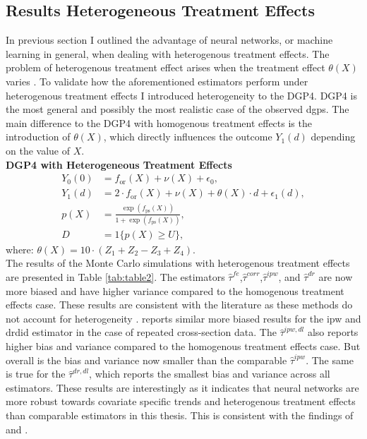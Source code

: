 \subsection{Results Heterogeneous Treatment Effects}
In previous section I outlined the advantage of neural networks, or machine learning in general, when dealing with heterogenous treatment effects.
The problem of heterogenous treatment effect arises when the treatment effect $\theta(X)$ varies \citep{hansen2022econometrics}.
To validate how the aforementioned estimators perform under heterogenous treatment effects I introduced heterogeneity to the DGP4.
DGP4 is the most general and possibly the most realistic case of the observed \ac{dgp}s.
The main difference to the DGP4 with homogenous treatment effects is the introduction of $\theta(X)$, which directly influences the outcome $Y_1(d)$ depending on the value of $X$.
\\
\textbf{DGP4 with Heterogeneous Treatment Effects}
\begin{align*}
    Y_0(0) &= f_{\text{or}}(X) + \nu(X) + \epsilon_0, \\
    Y_1(d) &= 2 \cdot f_{\text{or}}(X) + \nu(X) + \theta(X) \cdot d + \epsilon_1(d), \\
    p(X) &= \frac{\exp \left( f_{\text{ps}}(X) \right)}{1 + \exp \left( f_{\text{ps}}(X) \right)}, \\
    D &= 1\{ p(X) \geq U \},
\end{align*}
where: $\theta(X) = 10 \cdot (Z_1 + Z_2 - Z_3 + Z_4)$.\\

The results of the Monte Carlo simulations with heterogenous treatment effects are presented in Table \ref{tab:table2}.
The estimators $\hat{\tau}^{fe}$,$\hat{\tau}^{corr}$,$\hat{\tau}^{ipw}$, and $\hat{\tau}^{dr}$ are now more biased and have higher variance compared to the homogenous treatment effects case.
These results are consistent with the literature as these methods do not account for heterogeneity \citep{hansen2022econometrics}.
\citet{manfeDifferenceInDifferenceDesignRepeated} reports similar more biased results for the \ac{ipw} and \ac{drdid} estimator in the case of repeated cross-section data.
The $\hat{\tau}^{ipw,dl}$ also reports higher bias and variance compared to the homogenous treatment effects case.
But overall is the bias and variance now smaller than the comparable $\hat{\tau}^{ipw}$.
The same is true for the $\hat{\tau}^{dr,dl}$, which reports the smallest bias and variance across all estimators.
These results are interestingly as it indicates that neural networks are more robust towards covariate specific trends and heterogenous treatment effects than comparable estimators in this thesis.
This is consistent with the findings of \citet{farrellDeepNeuralNetworks2021} and \citet{chernozhukovDoubleDebiasedMachine2018}.

